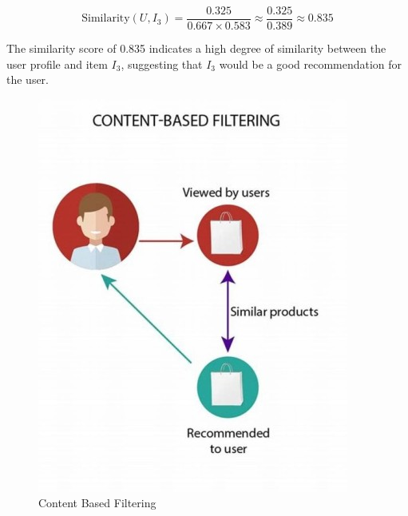 \documentclass[12pt, a4paper, oneside]{article}
\begin{document}
\[
\text{Similarity}(U, I_3) = \frac{0.325}{0.667 \times 0.583} \approx \frac{0.325}{0.389} \approx 0.835
\]

The similarity score of 0.835 indicates a high degree of similarity between the user profile and item \( I_3 \), suggesting that \( I_3 \) would be a good recommendation for the user.

      

\begin{figure}[H]
\includegraphics[width=\linewidth ]{content_based_filtering}
\centering
\caption{Content Based Filtering}
\label{fig:content_based_filtering}
\end{figure}
      






\break

\end{document}
